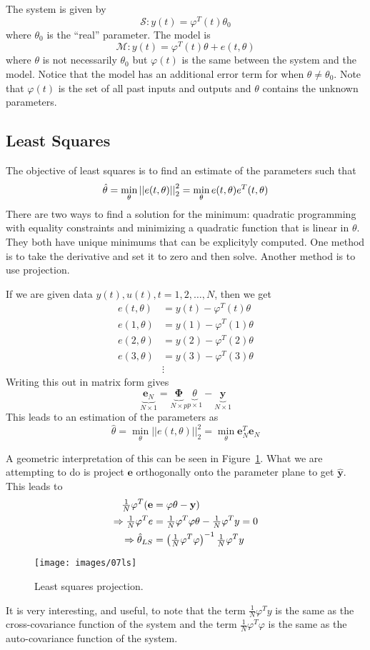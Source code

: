 The system is given by
$$\mathcal{S}: y(t) = \varphi^T(t)\theta_0$$
where $\theta_0$ is the ``real'' parameter.
The model is
$$\mathcal{M}: y(t) = \varphi^T(t)\theta + e(t,\theta)$$
where $\theta$ is not necessarily $\theta_0$ but $\varphi(t)$ is the same between the system and the model.
Notice that the model has an additional error term for when $\theta\neq\theta_0$.
Note that $\varphi(t)$ is the set of all past inputs and outputs and $\theta$ contains the unknown parameters.

\subsection{Least Squares}
The objective of least squares is to find an estimate of the parameters such that
$$\hat{\theta} = \min_\theta\left|\left|e(t,\theta)\right|\right|_2^2 = \min_\theta e(t,\theta)e^T(t,\theta)$$
There are two ways to find a solution for the minimum: quadratic programming with equality constraints and minimizing a quadratic function that is linear in $\theta$.
They both have unique minimums that can be explicityly computed.
One method is to take the derivative and set it to zero and then solve.
Another method is to use projection.

If we are given data $y(t),u(t),t=1,2,\ldots,N$, then we get
\begin{align*}
e(t,\theta) &= y(t) - \varphi^T(t)\theta \\
e(1,\theta) &= y(1) - \varphi^T(1)\theta \\
e(2,\theta) &= y(2) - \varphi^T(2)\theta \\
e(3,\theta) &= y(3) - \varphi^T(3)\theta \\
&\vdots
\end{align*}
Writing this out in matrix form gives
$$\underbrace{\mathbf{e}_N}_{N\times 1} = \underbrace{\mathbf{\Phi}}_{N\times p}\underbrace{\theta}_{p\times 1} - \underbrace{\mathbf{y}}_{N\times 1}$$
This leads to an estimation of the parameters as
$$\hat{\theta} = \min_\theta ||e(t,\theta)||_2^2 = \min_\theta \mathbf{e}_N^T\mathbf{e}_N$$

A geometric interpretation of this can be seen in Figure~\ref{fig:07ls}.
What we are attempting to do is project $\mathbf{e}$ orthogonally onto the parameter plane to get $\hat{\mathbf{y}}$.
This leads to
\begin{align*}
\tfrac{1}{N}\vp^T(\mathbf{e} &= \mathbf{\vp}\mathbf{\theta} - \mathbf{y}) \\
\Rightarrow \tfrac{1}{N}\vp^T e &= \tfrac{1}{N}\vp^T\vp\theta - \tfrac{1}{N}\vp^T y = 0 \\
\Rightarrow \hat{\theta}_{LS} &= \left(\tfrac{1}{N}\vp^T \vp\right)^{-1} \tfrac{1}{N}\vp^T y%
\end{align*}

\begin{figure}[ht!]
\centering
\texttt{[image: images/07ls]}
\caption{Least squares projection.}
\label{fig:07ls}
\end{figure}

It is very interesting, and useful, to note that the term $\tfrac{1}{N}\varphi^T y$ is the same as the cross-covariance function of the system and the term $\tfrac{1}{N}\varphi^T\varphi$ is the same as the auto-covariance function of the system.
